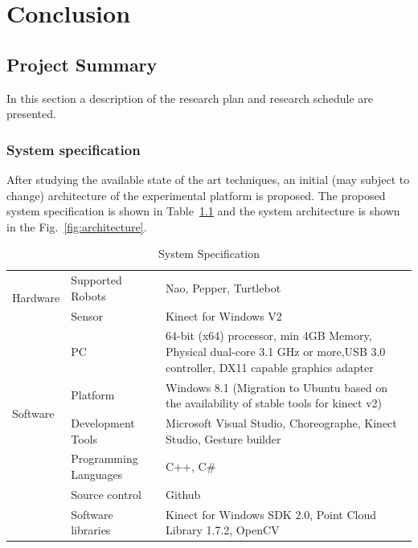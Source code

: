 
\chapter{Conclusion} %
\label{Chapter7} %
\section{Project Summary}
In this section a description of the research plan and research schedule are presented.
\subsection{System specification}
 After studying the available state of the art techniques, an initial (may subject to change) architecture of the experimental platform is proposed. The proposed system specification is shown in Table~\ref{table:system} and the system architecture is shown in the Fig.~\ref{fig:architecture}.
\begin{table}
\centering
\footnotesize
\caption{System Specification}
\label{table:system}
\begin{tabularx}{\textwidth}{X X X}
\toprule
  \multirow{2}{*}{Hardware} & Supported Robots & Nao, Pepper, Turtlebot \\
                            & Sensor & Kinect for Windows V2 \\
                            & PC & 64-bit (x64) processor, min 4GB Memory, Physical dual-core 3.1 GHz or more,USB 3.0 controller, DX11 capable graphics adapter\\
                                          \toprule                                       
  \multirow{2}{*}{Software} & Platform & Windows 8.1 (Migration to Ubuntu based on the availability of stable tools for kinect v2) \\
                            & Development Tools & Microsoft Visual Studio, Choreographe, Kinect Studio, Gesture builder \\
                            & Programming Languages & C++, C\# \\
                            & Source control & Github \\
                            & Software libraries & Kinect for Windows SDK 2.0, Point Cloud Library 1.7.2, OpenCV
                                          \tabularnewline\toprule
\end{tabularx}
\end{table}

